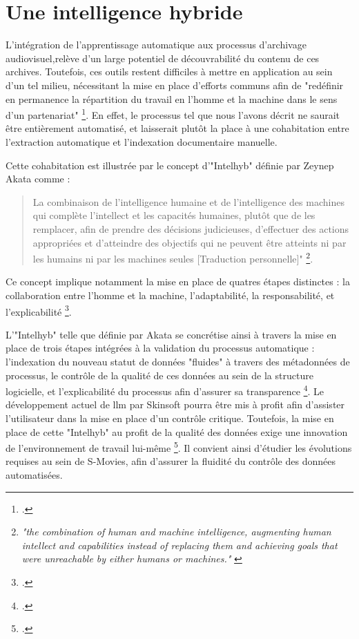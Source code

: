 
\chapter{\label{III_1} Une intelligence hybride}

L'intégration de l'apprentissage automatique aux processus d'archivage audiovisuel,relève d'un large potentiel de découvrabilité du contenu de ces archives. Toutefois, ces outils restent difficiles à mettre en application au sein d'un tel milieu, nécessitant la mise en place d'efforts communs afin de "redéfinir en permanence la répartition du travail en l'homme et la machine dans le sens d'un partenariat" \footcite{zotero-item-584}. En effet, le processus tel que nous l'avons décrit ne saurait être entièrement automatisé, et laisserait plutôt la place à une cohabitation entre l'extraction automatique et l'indexation documentaire manuelle.

Cette cohabitation est illustrée par le concept d'"\gls{Intelhyb}" définie par Zeynep Akata comme :

\begin{quote}
	La combinaison de l'intelligence humaine et de l'intelligence des machines qui complète l'intellect et les capacités humaines, plutôt que de les remplacer, afin de prendre des décisions judicieuses, d'effectuer des actions appropriées et d'atteindre des objectifs qui ne peuvent être atteints ni par les humains ni par les machines seules [Traduction personnelle]" \footnote{\textit{"the combination of human and machine intelligence, augmenting human intellect and capabilities instead of replacing them and achieving goals that were unreachable by either humans or machines."} \cite{akata2020}}.
\end{quote}
Ce concept implique notamment la mise en place de quatres étapes distinctes : la collaboration entre l'homme et la machine, l'adaptabilité, la responsabilité, et l'explicabilité \footcite{akata2020}.








L'"\gls{Intelhyb}" telle que définie par Akata se concrétise ainsi à travers la mise en place de trois étapes intégrées à la validation du processus automatique : l'indexation du nouveau statut de données "fluides" à travers des métadonnées de processus, le contrôle de la qualité de ces données au sein de la structure logicielle, et l'explicabilité du processus afin d'assurer sa transparence \footcites{akata2020}{zotero-item-584}. Le développement actuel de \gls{llm} par Skinsoft pourra être mis à profit afin d'assister l'utilisateur dans la mise en place d'un contrôle critique. Toutefois, la mise en place de cette "\gls{Intelhyb}" au profit de la qualité des données exige une innovation de l'environnement de travail lui-même \footcite{akata2020}. Il convient ainsi d'étudier les évolutions requises au sein de S-Movies, afin d'assurer la fluidité du contrôle des données automatisées. 